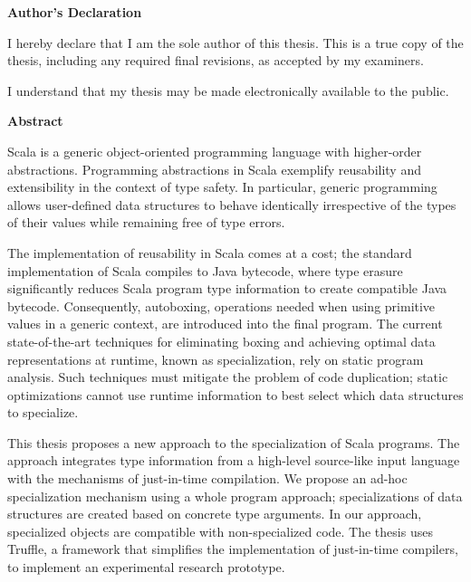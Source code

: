 \cleardoublepage %

  \begin{center}\textbf{Author's Declaration}\end{center}
  \noindent
I hereby declare that I am the sole author of this thesis. This is a true copy of the thesis, including any required final revisions, as accepted by my examiners.

  \bigskip
  
  \noindent
I understand that my thesis may be made electronically available to the public.

\cleardoublepage


\begin{center}\textbf{Abstract}\end{center}

Scala is a generic object-oriented programming language with higher-order abstractions. 
Programming abstractions in Scala exemplify reusability and extensibility in the context of type safety.
In particular, generic programming allows user-defined data structures to behave identically irrespective of the types of their values while remaining free of type errors.

The implementation of reusability in Scala comes at a cost; the standard implementation of Scala compiles to Java bytecode, where type erasure significantly reduces Scala program type information to create compatible Java bytecode.
Consequently, autoboxing, operations needed when using primitive values in a generic context, are introduced into the final program. 
The current state-of-the-art techniques for eliminating boxing and achieving optimal data representations at runtime, known as specialization, rely on static program analysis.
Such techniques must mitigate the problem of code duplication; static optimizations cannot use runtime information to best select which data structures to specialize.

This thesis proposes a new approach to the specialization of Scala programs.
The approach integrates type information from a high-level source-like input language with the mechanisms of just-in-time compilation.
We propose an ad-hoc specialization mechanism using a whole program approach; specializations of data structures are created based on concrete type arguments.
In our approach, specialized objects are compatible with non-specialized code.
The thesis uses Truffle, a framework that simplifies the implementation of just-in-time compilers, to implement an experimental research prototype.

